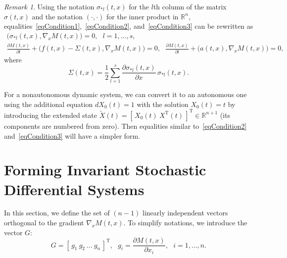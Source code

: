 \documentclass[10pt,reqno]{amsart}
\newcommand{\trans}{{\scriptscriptstyle \mathrm{T}}}
\theoremstyle{plain}
\theoremstyle{remark}
\newtheorem{Remark}{Remark}
\begin{document}
\begin{Remark}\label{rem1}
Using the notation $\sigma_{*l}(t,x)$ for the $l$th column of the matrix $\sigma(t,x)$ and the notation $(\cdot,\cdot)$ for the inner product in $\mathds{R}^n$, equalities~\eqref{eqCondition1},~\eqref{eqCondition2}, and~\eqref{eqCondition3} can be rewritten as
\begin{gather*}
  \bigl( \sigma_{*l}(t,x), \nabla_x M(t,x) \bigr) = 0, \ \ \ l = 1,\dots,s, \\
  \frac{\partial M(t,x)}{\partial t} + \bigl( f(t,x) - \Sigma(t,x), \nabla_x M(t,x) \bigr) = 0, \ \ \ \frac{\partial M(t,x)}{\partial t} + \bigl( a(t,x), \nabla_x M(t,x) \bigr) = 0,
\end{gather*}
where
\begin{equation}\label{eqDefSigma}
  \Sigma(t,x) = \frac{1}{2} \sum_{l = 1}^s {\frac{\partial \sigma_{*l}(t,x)}{\partial x} \, \sigma_{*l}(t,x)}.
\end{equation}

For a nonautonomous dynamic system, we can convert it to an autonomous one using the additional equation $dX_0(t) = 1$ with the solution $X_0(t) = t$ by introducing the extended state $\tilde X(t) = [ \, X_0(t) ~ X^\trans(t) \, ]^\trans \in \mathds{R}^{n+1}$ (its components are numbered from zero). Then equalities similar to~\eqref{eqCondition2} and~\eqref{eqCondition3} will have a simpler form.
\end{Remark}



\section{Forming Invariant Stochastic Differential Systems}\label{secMethod}

In this section, we define the set of $(n-1)$ linearly independent vectors orthogonal to the gradient $\nabla_x M(t,x)$. To simplify notations, we introduce the vector $G$:
\begin{equation}\label{eqDefG}
  G = [ \, g_1 ~ g_2 ~ \dots ~ g_n \, ]^\trans, \ \ \ g_i = \frac{\partial M(t,x)}{\partial x_i}, \ \ \ i = 1,\dots,n.
\end{equation}
\end{document}
